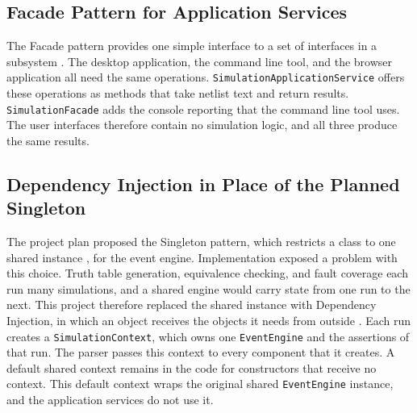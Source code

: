 \subsection{Facade Pattern for Application Services}

The Facade pattern provides one simple interface to a set of interfaces in a subsystem .
The desktop application, the command line tool, and the browser application all need the same operations.
\texttt{SimulationApplicationService} offers these operations as methods that take netlist text and return results.
\texttt{SimulationFacade} adds the console reporting that the command line tool uses.
The user interfaces therefore contain no simulation logic, and all three produce the same results.

\subsection{Dependency Injection in Place of the Planned Singleton}

The project plan proposed the Singleton pattern, which restricts a class to one shared instance , for the event engine.
Implementation exposed a problem with this choice.
Truth table generation, equivalence checking, and fault coverage each run many simulations, and a shared engine would carry state from one run to the next.
This project therefore replaced the shared instance with Dependency Injection, in which an object receives the objects it needs from outside .
Each run creates a \texttt{SimulationContext}, which owns one \texttt{EventEngine} and the assertions of that run.
The parser passes this context to every component that it creates.
A default shared context remains in the code for constructors that receive no context.
This default context wraps the original shared \texttt{EventEngine} instance, and the application services do not use it.

